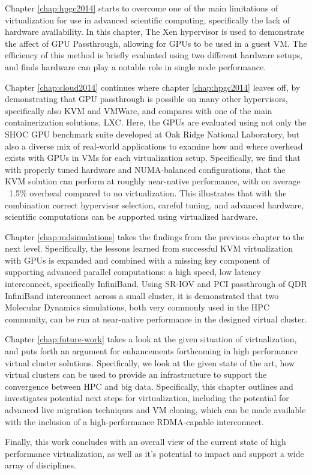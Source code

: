 Chapter \ref{chap:hpgc2014} starts to overcome one of the main limitations of virtualization for use in advanced scientific computing, specifically the lack of hardware availability. In this chapter, The Xen hypervisor is used to demonstrate the affect of GPU Passthrough, allowing for GPUs to be used in a guest VM. The efficiency of this method is briefly evaluated using two different hardware setups, and finds hardware can play a notable role in single node performance. 

Chapter \ref{chap:cloud2014} continues where chapter \ref{chap:hpgc2014} leaves off, by demonstrating that GPU passthrough is possible on many other hypervisors, specifically also KVM and VMWare, and compares with one of the main containerization solutions, LXC. Here, the GPUs are evaluated using not only the SHOC GPU benchmark suite developed at Oak Ridge National Laboratory, but also a diverse mix of real-world applications to examine how and where overhead exists with GPUs in VMs for each virtualization setup.  Specifically, we find that with properly tuned hardware and NUMA-balanced configurations, that the KVM solution can perform at roughly near-native performance, with on average ~1.5\% overhead compared to no virtualization. This illustrates that with the combination correct hypervisor selection, careful tuning, and advanced hardware, scientific computations can be supported using virtualized hardware. 

Chapter \ref{chap:mdsimulations} takes the findings from the previous chapter to the next level. Specifically, the lessons learned from successful KVM virtualization with GPUs is expanded and combined with a missing key component of supporting advanced parallel computations: a high speed, low latency interconnect, specifically InfiniBand. Using SR-IOV and PCI passthrough of QDR InfiniBand interconnect across a small cluster, it is demonstrated that two Molecular Dynamics simulations, both very commonly used in the HPC community, can be run at near-native performance in the designed virtual cluster.

Chapter \ref{chap:future-work} takes a look at the given situation of virtualization, and puts forth an argument for enhancements forthcoming in high performance virtual cluster solutions. Specifically, we look at the given state of the art, how virtual clusters can be used to provide an infrastructure to support the convergence between HPC and big data. Specifically, this chapter outlines and investigates potential next steps for virtualization, including the potential for advanced live migration techniques and VM cloning, which can be made available with the inclusion of a high-performance RDMA-capable interconnect. 

Finally, this work concludes with an overall view of the current state of high performance virtualization, as well as it's potential to impact and support a wide array of disciplines. 



